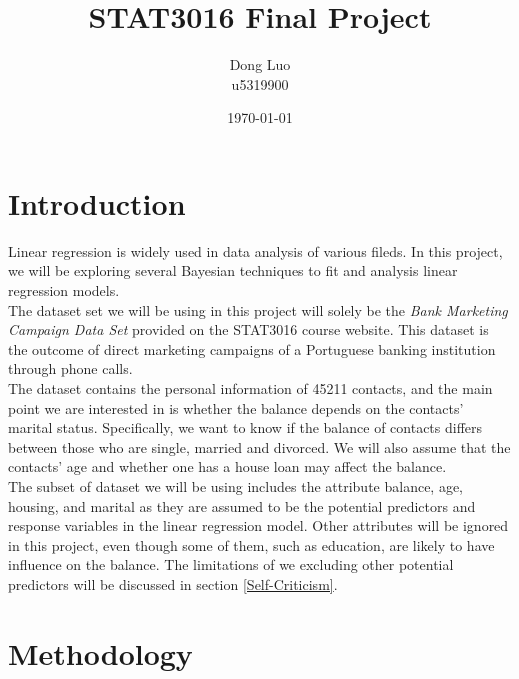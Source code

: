 \documentclass[a4page]{article}
\title{STAT3016 Final Project}
\author{Dong Luo\\ u5319900}
\date{\today}
\begin{document}
	\maketitle
	\section{Introduction}
	Linear regression is widely used in data analysis of various fileds. In this project, we will be exploring several Bayesian techniques to fit and analysis linear regression models.\\
	The dataset set we will be using in this project will solely be the \textit{Bank Marketing Campaign Data Set} provided on the STAT3016 course website. This dataset is the outcome of direct marketing campaigns of a Portuguese banking institution through phone calls.\\
	The dataset contains the personal information of 45211 contacts, and the main point we are interested in is whether the balance depends on the contacts' marital status. Specifically, we want to know if the balance of contacts differs between those who are single, married and divorced. We will also assume that the contacts' age and whether one has a house loan may affect the balance.\\
	The subset of dataset we will be using includes the attribute balance, age, housing, and marital as they are assumed to be the potential predictors and response variables in the linear regression model. Other attributes will be ignored in this project, even though some of them, such as education, are likely to have influence on the balance. The limitations of we excluding other potential predictors will be discussed in section \ref{Self-Criticism}.


	\section{Methodology}
\end{document}
